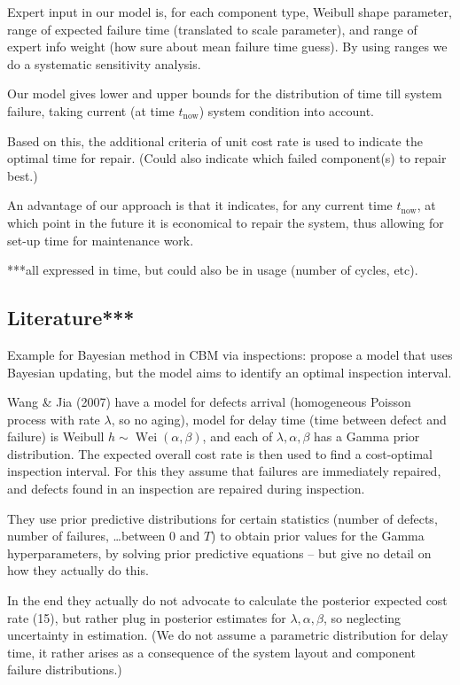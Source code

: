 \documentclass[authoryear]{elsarticle}
\newcommand{\wei}{\operatorname{Wei}} %
\def\tnow{t_\text{now}}
\begin{document}
Expert input in our model is, for each component type,
Weibull shape parameter, range of expected failure time (translated to scale parameter),
and range of expert info weight (how sure about mean failure time guess).
By using ranges we do a systematic sensitivity analysis.

Our model gives lower and upper bounds for the distribution of time till system failure,
taking current (at time $\tnow$) system condition into account.

Based on this, the additional criteria of unit cost rate is used to indicate the optimal time for repair.
(Could also indicate which failed component(s) to repair best.)

An advantage of our approach is that
it indicates, for any current time $\tnow$, at which point in the future it is economical to repair the system,
thus allowing for set-up time for maintenance work.

***all expressed in time, but could also be in usage (number of cycles, etc).

\subsection{Literature***}

Example for Bayesian method in CBM via inspections: \cite{2007:wang-jia}
propose a model that uses Bayesian updating,
but the model aims to identify an optimal inspection interval.

\begin{scriptsize}
Wang \& Jia (2007) have a model for defects arrival (homogeneous Poisson process with rate $\lambda$, so no aging),
model for delay time (time between defect and failure) is Weibull $h \sim \wei(\alpha,\beta)$,
and each of $\lambda, \alpha, \beta$ has a Gamma prior distribution.
The expected overall cost rate is then used to find a cost-optimal inspection interval.
For this they assume that failures are immediately repaired,
and defects found in an inspection are repaired during inspection.

They use prior predictive distributions for certain statistics (number of defects, number of failures, \ldots between $0$ and $T$)
to obtain prior values for the Gamma hyperparameters,
by solving prior predictive equations -- but give no detail on how they actually do this.

In the end they actually do not advocate to calculate the posterior expected cost rate (15),
but rather plug in posterior estimates for $\lambda, \alpha, \beta$,
so neglecting uncertainty in estimation.
(We do not assume a parametric distribution for delay time,
it rather arises as a consequence of the system layout and component failure distributions.)

\end{scriptsize}
\end{document}

